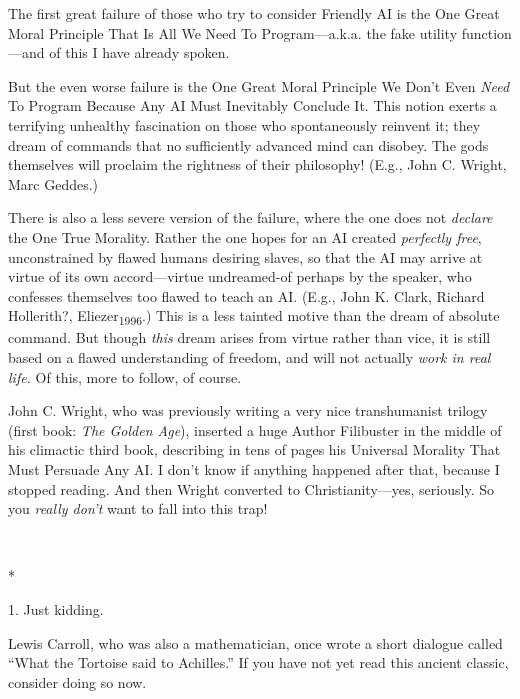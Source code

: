 {
 The first great failure of those who try to consider Friendly AI
is the One Great Moral Principle That Is All We Need To
Program---a.k.a. the fake utility function---and of this I have already
spoken.}

{
 But the even worse failure is the One Great Moral Principle We
Don't Even \textit{Need} To Program Because Any AI Must
Inevitably Conclude It. This notion exerts a terrifying unhealthy
fascination on those who spontaneously reinvent it; they dream of
commands that no sufficiently advanced mind can disobey. The gods
themselves will proclaim the rightness of their philosophy! (E.g., John
C. Wright, Marc Geddes.)}

{
 There is also a less severe version of the failure, where the one
does not \textit{declare} the One True Morality. Rather the one hopes
for an AI created \textit{perfectly free}, unconstrained by flawed
humans desiring slaves, so that the AI may arrive at virtue of its own
accord---virtue undreamed-of perhaps by the speaker, who confesses
themselves too flawed to teach an AI. (E.g., John K. Clark, Richard
Hollerith?, Eliezer\textsubscript{1996}.) This is a less tainted motive
than the dream of absolute command. But though \textit{this} dream
arises from virtue rather than vice, it is still based on a flawed
understanding of freedom, and will not actually \textit{work in real
life.} Of this, more to follow, of course.}

{
 John C. Wright, who was previously writing a very nice
transhumanist trilogy (first book: \textit{The Golden Age}), inserted a
huge Author Filibuster in the middle of his climactic third book,
describing in tens of pages his Universal Morality That Must Persuade
Any AI. I don't know if anything happened after that,
because I stopped reading. And then Wright converted to
Christianity---yes, seriously. So you \textit{really
don't} want to fall into this trap!}

{\centering
 \ ~
\par}

{\centering
 *
\par}


\bigskip

{
 1. Just kidding.}


{
 Lewis Carroll, who was also a mathematician, once wrote a short
dialogue called ``What the Tortoise said to
Achilles.'' If you have not yet read this ancient
classic, consider doing so now. }

